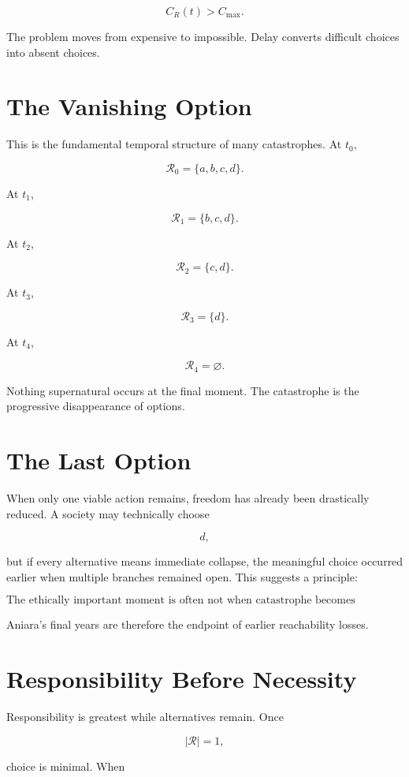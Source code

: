 \documentclass[11pt,oneside]{book}
\theoremstyle{definition}
\theoremstyle{remark}
\newcommand{\R}{\mathcal{R}}
\begin{document}
\[
C_R(t)>C_{\max}.
\]

The problem moves from expensive to impossible. Delay converts difficult choices into absent
choices.

\section{The Vanishing Option}

This is the fundamental temporal structure of many catastrophes. At \(t_0\),

\[
\R_0=\{a,b,c,d\}.
\]

At \(t_1\),

\[
\R_1=\{b,c,d\}.
\]

At \(t_2\),

\[
\R_2=\{c,d\}.
\]

At \(t_3\),

\[
\R_3=\{d\}.
\]

At \(t_4\),

\[
\R_4=\varnothing.
\]

Nothing supernatural occurs at the final moment. The catastrophe is the progressive disappearance of
options.

\section{The Last Option}

When only one viable action remains, freedom has already been drastically reduced. A society may
technically choose

\[
d,
\]

but if every alternative means immediate collapse, the meaningful choice occurred earlier when
multiple branches remained open. This suggests a principle:

\[
\boxed{ \text{The ethically important moment is often not when catastrophe becomes unavoidable, but when avoidability begins to contract.} }
\]

Aniara's final years are therefore the endpoint of earlier reachability losses.

\section{Responsibility Before Necessity}

Responsibility is greatest while alternatives remain. Once

\[
|\R|=1,
\]

choice is minimal. When
\end{document}
